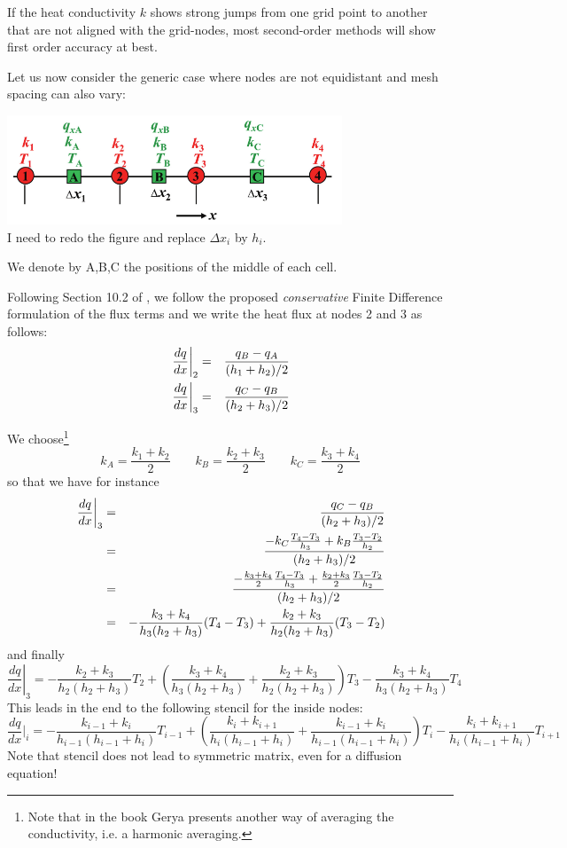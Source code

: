 \begin{remark}
If the heat conductivity $k$ shows strong jumps from one grid point to another that are not aligned with
the grid-nodes, most second-order methods will show first order accuracy at best.
\end{remark}

Let us now consider the generic case where nodes are not equidistant and mesh spacing can also vary:
\begin{center}
\includegraphics[width=10cm]{python_codes/fieldstone_180/gerya_stencil}\\
{\captionfont I need to redo the figure and replace $\Delta x_i$ by $h_i$.}
\end{center}
We denote by A,B,C the positions of the middle of each cell.

Following Section 10.2 of \textcite{gery19book}, we follow the
proposed {\it conservative} Finite Difference formulation of the flux terms
and we write the heat flux at nodes 2 and 3 as follows:
\begin{eqnarray}
\left.\frac{dq}{dx}\right|_2 &=& \frac{q_B-q_A}{(h_1+h_2)/2} \nonumber\\
\left.\frac{dq}{dx}\right|_3 &=& \frac{q_C-q_B}{(h_2+h_3)/2} \nonumber
\end{eqnarray}

We choose\footnote{Note that in the book Gerya presents 
another way of averaging the conductivity, i.e. a harmonic averaging.} 
\[
k_A = \frac{k_1+k_2}{2}
\qquad
k_B = \frac{k_2+k_3}{2}
\qquad
k_C = \frac{k_3+k_4}{2}
\]
so that we have for instance
\begin{eqnarray}
\left.\frac{dq}{dx}\right|_3
&=& \frac{q_C-q_B}{(h_2+h_3)/2} \nonumber\\
&=& \frac{-k_C \frac{T_4-T_3}{h_3} + k_B \frac{T_3-T_2}{h_2}  }{(h_2+h_3)/2} \nonumber\\
&=& \frac{- \frac{k_3+k_4}{2} \frac{T_4-T_3}{h_3} + \frac{k_2+k_3}{2} \frac{T_3-T_2}{h_2}  }{(h_2+h_3)/2} \nonumber\\
&=& -\frac{k_3+k_4}{h_3(h_2+h_3)} (T_4-T_3)+  \frac{k_2+k_3}{h_2(h_2+h_3)} (T_3-T_2)\nonumber
\end{eqnarray}
and finally
\[
\left.\frac{dq}{dx}\right|_3
=
-\frac{k_2+k_3}{h_2(h_2+h_3)} T_2
+ \left(
\frac{k_3+k_4}{h_3(h_2+h_3)} + \frac{k_2+k_3}{h_2(h_2+h_3)} 
\right) T_3
-\frac{k_3+k_4}{h_3(h_2+h_3)} T_4
\]
This leads in the end to the following stencil for the inside nodes:
\[
\frac{dq}{dx}|_i
= - \frac{k_{i-1}+k_i}{h_{i-1} (h_{i-1}+h_i)} T_{i-1}
+\left(
\frac{k_{i}+k_{i+1}}{h_{i} (h_{i-1}+h_i)} +
\frac{k_{i-1}+k_i}{h_{i-1} (h_{i-1}+h_i)}
\right) T_i
 - \frac{k_{i}+k_{i+1}}{h_{i} (h_{i-1}+h_i)} T_{i+1}
\]
Note that stencil does not lead to symmetric matrix, even for a diffusion equation!

